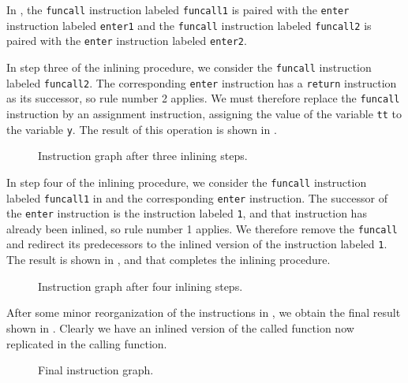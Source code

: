 In , the \texttt{funcall} instruction labeled
\texttt{funcall1} is paired with the \texttt{enter} instruction
labeled \texttt{enter1} and the \texttt{funcall} instruction labeled
\texttt{funcall2} is paired with the \texttt{enter} instruction
labeled \texttt{enter2}.

In step three of the inlining procedure, we consider the
\texttt{funcall} instruction labeled \texttt{funcall2}.  The
corresponding \texttt{enter} instruction has a \texttt{return}
instruction as its successor, so rule number 2 applies.  We must
therefore replace the \texttt{funcall} instruction by an assignment
instruction, assigning the value of the variable \texttt{tt} to the
variable \texttt{y}.  The result of this operation is shown in
.

\begin{figure}
\begin{center}
\end{center}
\caption{\label{fig45}
Instruction graph after three inlining steps.}
\end{figure}

In step four of the inlining procedure, we consider the
\texttt{funcall} instruction labeled \texttt{funcall1} in
 and the corresponding \texttt{enter} instruction. The
successor of the \texttt{enter} instruction is the instruction labeled
\texttt{1}, and that instruction has already been inlined, so rule
number 1 applies.  We therefore remove the \texttt{funcall} and
redirect its predecessors to the inlined version of the instruction
labeled \texttt{1}.  The result is shown in , and that
completes the inlining procedure.

\begin{figure}
\begin{center}
\end{center}
\caption{\label{fig46}
Instruction graph after four inlining steps.}
\end{figure}

After some minor reorganization of the instructions in ,
we obtain the final result shown in .  Clearly we have an
inlined version of the called function now replicated in the calling
function.

\begin{figure}
\begin{center}
\end{center}
\caption{\label{fig47}
Final instruction graph.}
\end{figure}

